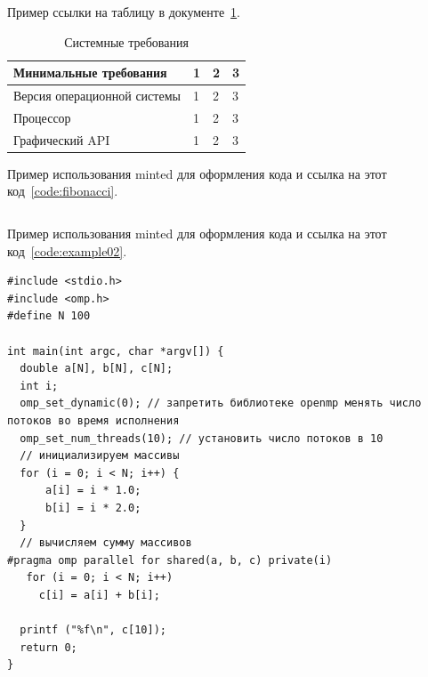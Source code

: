 Пример ссылки на таблицу в документе~\ref{tab:example02}.
\begin{table}[H]
\caption{\centering\label{tab:example02}Системные требования}
\begin{tabular}{|p{3 cm}|p{3 cm}|p{3 cm}|p{5 cm}|}
\hline
Минимальные требования & 1 & 2 & 3 \\ \hline
Версия операционной системы & 1 & 2 & 3 \\ \hline
Процессор & 1 & 2 & 3 \\ \hline
Графический API & 1 & 2 & 3 \\ \hline
\end{tabular}
\end{table}

Пример использования minted для оформления кода и ссылка на этот код~\ref{code:fibonacci}.
\begin{code}
\vspace{-\baselineskip}\inputminted{python}{src/fibonacci.py}
\end{code}

Пример использования minted для оформления кода и ссылка на этот код~\ref{code:example02}.
\begin{code}
\vspace{-\baselineskip}\begin{verbatim}
#include <stdio.h>
#include <omp.h>
#define N 100

int main(int argc, char *argv[]) {
  double a[N], b[N], c[N];
  int i;
  omp_set_dynamic(0); // запретить библиотеке openmp менять число потоков во время исполнения
  omp_set_num_threads(10); // установить число потоков в 10
  // инициализируем массивы
  for (i = 0; i < N; i++) {
      a[i] = i * 1.0;
      b[i] = i * 2.0;
  }
  // вычисляем сумму массивов
#pragma omp parallel for shared(a, b, c) private(i)
   for (i = 0; i < N; i++)
     c[i] = a[i] + b[i];

  printf ("%f\n", c[10]);
  return 0;
}
\end{verbatim}
\end{code}
